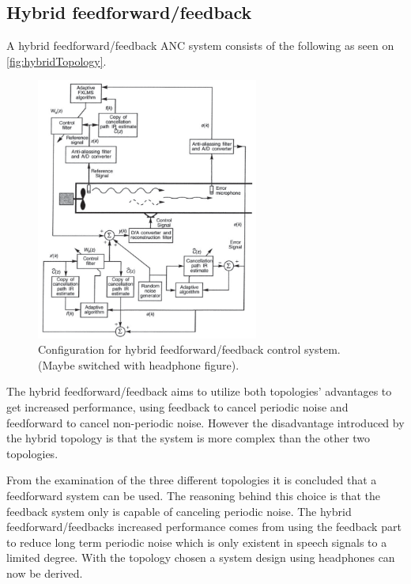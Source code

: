 \subsection*{Hybrid feedforward/feedback}    
A hybrid feedforward/feedback ANC system consists of the following as seen on \autoref{fig:hybridTopology}.
\begin{figure}[H]
	\centering
	\includegraphics[width=0.65\textwidth]{figures/BasicSystem/hybrid}
	\caption{Configuration for hybrid feedforward/feedback control system. (Maybe switched with headphone figure).}
	\label{fig:hybridTopology}
\end{figure}

The hybrid feedforward/feedback aims to utilize both topologies' advantages to get increased performance, using feedback to cancel periodic noise and feedforward to cancel non-periodic noise. However the disadvantage introduced by the hybrid topology is that the system is more complex than the other two topologies.   


From the examination of the three different topologies it is concluded that a feedforward system can be used. The reasoning behind this choice is that the feedback system only is capable of canceling periodic noise. The hybrid feedforward/feedbacks increased performance comes from using the feedback part to reduce long term periodic noise which is only existent in speech signals to a limited degree. With the topology chosen a system design using headphones can now be derived. 
